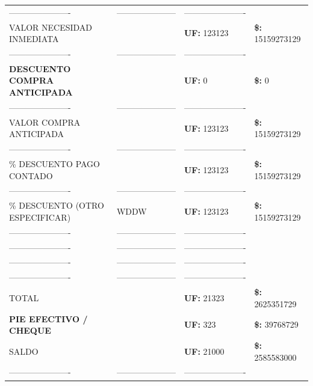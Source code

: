 \documentclass[10pt]{article}
\begin{document}
\begin{tabular}{llll}
\hline
\color{white}---------------------- & \color{white}--------------------- & \color{white}---------------------- \\
VALOR NECESIDAD INMEDIATA &  & \textbf{UF: } 123123 & \textbf{\$: }15159273129 \\ 
\color{white}---------------------- & \color{white}--------------------- & \color{white}---------------------- \\
\textbf{DESCUENTO COMPRA ANTICIPADA} & & \textbf{UF: }0& \textbf{\$: }0 \\ 
\color{white}---------------------- & \color{white}--------------------- & \color{white}---------------------- \\
VALOR COMPRA ANTICIPADA &  & \textbf{UF: }123123& \textbf{\$: }15159273129 \\  
\color{white}---------------------- & \color{white}--------------------- & \color{white}---------------------- \\
\% DESCUENTO PAGO CONTADO &  & \textbf{UF: }123123& \textbf{\$: }15159273129 \\  
\color{white}---------------------- & \color{white}--------------------- & \color{white}---------------------- \\
\% DESCUENTO (OTRO ESPECIFICAR) &WDDW& \textbf{UF: }123123& \textbf{\$: }15159273129 \\  
\color{white}---------------------- & \color{white}--------------------- & \color{white}---------------------- \\
\color{white}---------------------- & \color{white}--------------------- & \color{white}---------------------- \\
\color{white}---------------------- & \color{white}--------------------- & \color{white}---------------------- \\
\color{white}---------------------- & \color{white}--------------------- & \color{white}---------------------- \\
TOTAL &  & \textbf{UF: }21323& \textbf{\$: }2625351729 \\  
\textbf{PIE EFECTIVO / CHEQUE} &  & \textbf{UF: }323& \textbf{\$: }39768729 \\   
SALDO &  & \textbf{UF: }21000 & \textbf{\$: } 2585583000 \\  
\color{white}---------------------- & \color{white}--------------------- & \color{white}---------------------- \\
\hline
\end{tabular}
\end{document}
